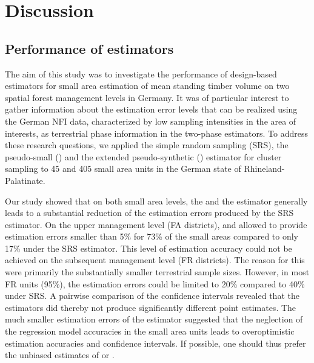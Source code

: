 \section{Discussion} %
\label{sec:Dis}

\subsection{Performance of estimators}

The aim of this study was to investigate the performance of design-based estimators for small area estimation of mean standing timber volume on two spatial forest management levels in Germany. It was of particular interest to gather information about the estimation error levels that can be realized using the German NFI data, characterized by low sampling intensities in the area of interests, as terrestrial phase information in the two-phase estimators. To address these research questions, we applied the simple random sampling (SRS), the pseudo-small (\psmall{}) and the extended pseudo-synthetic (\extpsynth{}) estimator for cluster sampling to 45 and 405 small area units in the German state of Rhineland-Palatinate.\par

Our study showed that on both small area levels, the \psmall{} and the \extpsynth{} estimator generally leads to a substantial reduction of the estimation errors produced by the SRS estimator. On the upper management level (FA districts), \psmall{} and \extpsynth{} allowed to provide estimation errors smaller than 5\% for 73\% of the small areas compared to only 17\% under the SRS estimator. This level of estimation accuracy could not be achieved on the subsequent management level (FR districts). The reason for this were primarily the substantially smaller terrestrial sample sizes. However, in most FR units (95\%), the estimation errors could be limited to 20\% compared to 40\% under SRS. A pairwise comparison of the confidence intervals revealed that the estimators did thereby not produce significantly different point estimates. The much smaller estimation errors of the \psynth{} estimator suggested that the neglection of the regression model accuracies in the small area units leads to overoptimistic estimation accuracies and confidence intervals. If possible, one should thus prefer the unbiased estimates of \psmall{} or \extpsynth{}.\par

